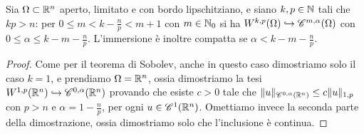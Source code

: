 \begin{teorema}[Morrey] \label{t:morrey}
    Sia $\Omega\subset\R^n$ aperto, limitato e con bordo lipschitziano, e siano $k,p\in\N$ tali che $kp>n$: per $0\le m<k-\frac{n}{p}<m+1$ con $m\in\N_0$ si ha $\sobW[k,p]{\Omega}\emb\cont[m,\alpha]{\Omega}$ con $0\le\alpha\le k-m-\frac{n}{p}$.
    L'immersione è inoltre compatta se $\alpha<k-m-\frac{n}{p}$.
\end{teorema}
\begin{proof}
    Come per il teorema di Sobolev, anche in questo caso dimostriamo solo il caso $k=1$, e prendiamo $\Omega=\R^n$, ossia dimostriamo la tesi $\sobW[1,p]{\R^n}\emb\cont[0,\alpha]{\R^n}$ provando che esiste $c>0$ tale che $\norm{u}_{\cont[0,\alpha]{\R^n}}\le c\norm{u}_{1,p}$ con $p>n$ e $\alpha=1-\frac{n}{p}$, per ogni $u\in\cont[1]{\R^n}$.
    Omettiamo invece la seconda parte della dimostrazione, ossia dimostriamo solo che l'inclusione è continua.


\end{proof}
